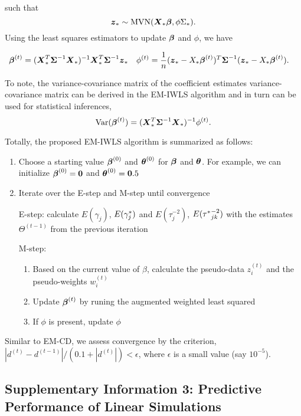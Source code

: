 \documentclass[]{article}
\providecommand{\tightlist}{%
  \setlength{\itemsep}{0pt}\setlength{\parskip}{0pt}}
\begin{document}
such that \[
\boldsymbol{z}_* \sim \text{MVN}(\boldsymbol{X}_* \boldsymbol{\beta} , \phi \Sigma_*).
\] Using the least squares estimators to update \(\boldsymbol{\beta}\) and
\(\phi\), we have

\begin{align*}
& \boldsymbol{\beta}^{(t)} = (\boldsymbol{X}_*^T \boldsymbol{\Sigma}^{-1} \boldsymbol{X}_*)^{-1}\boldsymbol{X}_*^T \boldsymbol{\Sigma}^{-1} \boldsymbol{z}_* && \phi^{(t)} = \frac{1}{n}(\boldsymbol{z}_*-X_*\boldsymbol{\beta}^{(t)})^T\boldsymbol{\Sigma}^{-1}(\boldsymbol{z}_*-X_*\boldsymbol{\beta}^{(t)}).&
\end{align*}

To note, the variance-covariance matrix of the coefficient estimates
variance-covariance matrix can be derived in the EM-IWLS algorithm and
in turn can be used for statistical inferences, \[
  \text{Var}(\boldsymbol{\beta}^{(t)}) = (\boldsymbol{X}_*^T\boldsymbol{\Sigma}^{-1} \boldsymbol{X}_*)^{-1}\phi^{(t)}.
\]

Totally, the proposed EM-IWLS algorithm is summarized as follows:

\begin{enumerate}
\def\labelenumi{\arabic{enumi})}
\item
  Choose a starting value \(\boldsymbol{\beta}^{(0)}\) and \(\boldsymbol{\theta}^{(0)}\)
  for \(\boldsymbol{\beta}\) and \(\boldsymbol{\theta}\). For example, we can initialize
  \(\boldsymbol{\beta}^{(0)} = \boldsymbol{0}\) and \(\boldsymbol{\theta}^{(0)} = \boldsymbol{0}.5\)
\item
  Iterate over the E-step and M-step until convergence

  E-step: calculate \(E(\gamma_{j})\), \(E(\gamma^*_{j})\) and
  \(E(\tau^{-2}_{j})\), \(E({\tau^*}^{-2}_{jk})\) with the estimates
  \(\Theta^{(t-1)}\) from the previous iteration

  M-step:

  \begin{enumerate}
  \def\labelenumii{\alph{enumii})}
  \tightlist
  \item
    Based on the current value of \(\beta\), calculate the pseudo-data
    \(z_i^{(t)}\) and the pseudo-weights \(w_i^{(t)}\)
  \item
    Update \(\boldsymbol{\beta}^{(t)}\) by runing the augmented weighted least
    squared
  \item
    If \(\phi\) is present, update \(\phi\)
  \end{enumerate}
\end{enumerate}

Similar to EM-CD, we assess convergence by the criterion,
\(|d^{(t)}-d^{(t-1)}|/(0.1+|d^{(t)}|)<\epsilon\), where \(\epsilon\) is
a small value (say \(10^{-5}\)).

\subsection{Supplementary Information 3: Predictive Performance of Linear Simulations}

 \clearpage

\end{document}
